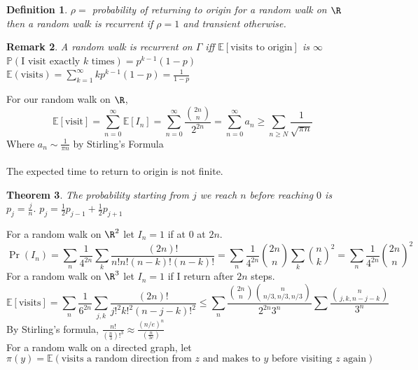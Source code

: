 \documentclass[a4paper]{article}
\newtheorem{thm}{Theorem}[section]
\newtheorem{defn}[thm]{Definition}
\newtheorem{rmk}[thm]{Remark}
\begin{document}
\begin{defn}
    $\rho=$ probability of returning to origin for a random walk on $\R$ then a random walk is recurrent if $\rho =1$ and transient otherwise.
\end{defn}
\begin{rmk}
    A random walk is recurrent on $\Gamma$ iff $\mathbb{E}[\text{visits to origin}]$  is $\infty$\\
    $\mathbb{P}(\text{I visit exactly $k$ times})=p^{k-1}(1-p)$\\
    $\mathbb{E}(\text{visits})=\sum_{k=1}^\infty kp^{k-1}(1-p)=\frac{1}{1-p}$
\end{rmk}
\noindent For our random walk on $\R$, $$\mathbb{E}[\text{visit}]=\sum_{n=0}^\infty \mathbb{E}[I_n]=\sum_{n=0}^{\infty}\frac{{2n \choose n}}{2^{2n}}=\sum_{n=0}^{\infty}a_n\geq \sum_{n\geq N}\frac{1}{\sqrt{\pi n}}$$
Where $a_n\sim \frac{1}{\pi n}$ by Stirling's Formula\\\\
The expected time to return to origin is not finite. 
\begin{thm}
    The probability starting from $j$ we reach $n$ before reaching $0$ is $p_j=\frac{j}{n}.$ $p_j=\frac{1}{2}p_{j-1}+\frac{1}{2}p_{j+1}$
\end{thm}
\noindent For a random walk on $\R^2$ let $I_n=1$ if at $0$ at $2n.$\\
$$\Pr(I_n)=\sum_n\frac{1}{4^{2n}}\sum_{k}\frac{(2n)!}{n!n!(n-k)!(n-k)!}=\sum_n\frac{1}{4^{2n}}{2n \choose n}\sum_k {n \choose k}^2=\sum_{n}\frac{1}{4^{2n}}{2n \choose n}^2$$
For a random walk on $\R^3$ let $I_n=1$ if I return after $2n$ steps.\\
$$\mathbb{E}[\text{visits}]=\sum_n \frac{1}{6^{2n}}\sum_{j,k}\frac{(2n)!}{j!^2k!^2(n-j-k)!^2}\leq \sum_n \frac{{2n \choose n}{n \choose n/3, n/3, n/3}}{2^{2n}3^n}\sum\frac{{n \choose j,k,n-j-k}}{3^n}$$
By Stirling's formula, $\frac{n!}{\left (\frac{n}{3} \right )!^3}\approx \frac{(n/e)^n}{\left (\frac{n}{3e} \right )}$\\
For a random walk on a directed graph, let $$\pi (y)=\mathbb{E}(\text{visits a random direction from $z$ and makes to $y$ before visiting $z$ again})$$
\end{document}
